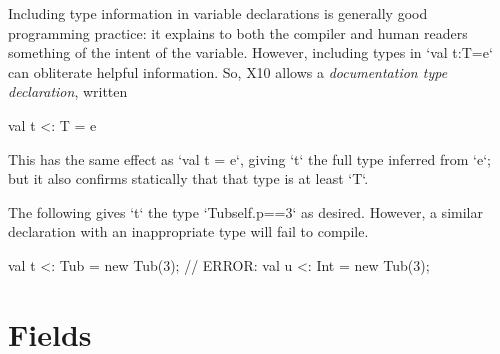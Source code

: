 \index{\Xcd{<:}}
Including type information in variable declarations is generally good
programming practice: it explains to both the compiler and human readers
something of the intent of the variable.  However, including types in 
\xcd`val t:T=e` can obliterate helpful information.  So, X10 allows a {\em
documentation type declaration}, written 
\begin{xtenmath}
val t <: T = e
\end{xtenmath}
This 
has the same effect as \xcd`val t = e`, giving \xcd`t` the full type inferred
from \xcd`e`; but it also confirms statically that that type is at least
\xcd`T`.  

\begin{ex}The following gives \xcd`t` the type \xcd`Tub{self.p==3}` as
desired.  However, a similar declaration with an inappropriate type will fail
to compile.
\begin{xten}
   val t <: Tub = new Tub(3);
   // ERROR: val u <: Int = new Tub(3);
\end{xten}

\end{ex}



\section{Fields}

